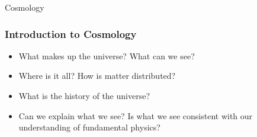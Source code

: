 \documentclass{beamer}
\begin{document}
\frame
{

    {\huge Cosmology}

}

\frame
{
    \frametitle{Introduction to Cosmology}


    \begin{itemize}

        \item What makes up the universe? What can we see?

        \item Where is it all?  How is matter distributed?

        \item What is the history of the universe?

        \item Can we explain what we see?  Is what we see consistent with our
            understanding of fundamental physics?

    \end{itemize}

}
\end{document}
